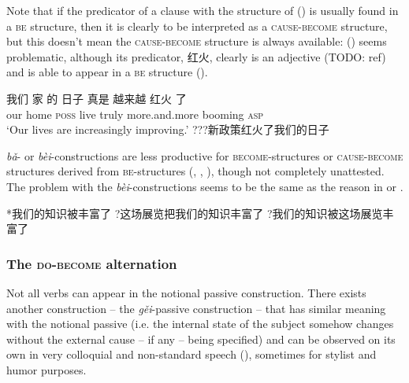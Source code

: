 \documentclass[UTF8, a4paper, oneside, scheme=plain, 12pt]{ctexrep}
\newcommand{\form}[1]{\emph{#1}}
\newcommand{\translate}[1]{`#1'}
\newcommand*{\category}[1]{\textsc{#1}}
\begin{document}
Note that if the predicator of 
a clause with the structure of ()
is usually found in a \category{be} structure, 
then it is clearly to be interpreted as a \category{cause}-\category{become} structure, 
but this doesn't mean the \category{cause}-\category{become} structure
is always available: 
() seems problematic,
although its predicator, 红火, clearly is an adjective (TODO: ref)
and is able to appear in a \category{be} structure 
().

\begin{exe}
    \ex\label{ex:verb-phrase.be-become.2} 
    \gll 我们 家 的 日子 真是 越来越 红火 了 \\
    our home \category{poss} live truly more.and.more booming \category{asp} \\
    \glt \translate{Our lives are increasingly improving.}
    \ex\label{ex:verb-phrase.be-become.cause-2} ???新政策红火了我们的日子
\end{exe}

\form{bǎ}- or \form{bèi}-constructions are less productive 
for \category{become}-structures or \category{cause}-\category{become} structures 
derived from \category{be}-structures 
(,
,
),
though not completely unattested.
The problem with the \form{bèi}-constructions
seems to be the same as the reason 
in 
or .

\begin{exe}
    \ex\label{ex:verb-phrase.be.impossible-1} *我们的知识被丰富了
    \ex\label{ex:verb-phrase.be.impossible-2} ?这场展览把我们的知识丰富了
    \ex\label{ex:verb-phrase.be.impossible-3} ?我们的知识被这场展览丰富了
\end{exe}

\subsubsection{The \category{do}-\category{become} alternation}\label{sec:ver-phrase.gei}

Not all verbs can appear in the notional passive construction.
There exists another construction -- the \form{gěi}-passive construction -- 
that has similar meaning with the notional passive
(i.e. the internal state of the subject somehow changes 
without the external cause -- if any -- being specified) and
can be observed on its own 
in very colloquial and non-standard speech
(),
sometimes for stylist and humor purposes.
\end{document}
